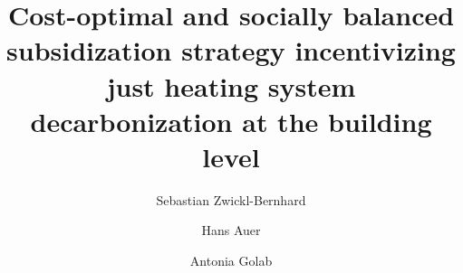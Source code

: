 \documentclass[review]{elsarticle}
\begin{document}
\begin{frontmatter}

\title{Cost-optimal and socially balanced subsidization strategy incentivizing just heating system decarbonization at the building level}
\author[1]{Sebastian Zwickl-Bernhard}
\author[1]{Hans Auer}
\author[1]{Antonia Golab}
\address[1]{Energy Economics Group (EEG), Technische Universität Wien, Gusshausstrasse 25-29/E370-3, 1040 Wien, Austria}

\begin{abstract}

\end{abstract}

\begin{keyword}
	
\end{keyword}
\end{frontmatter}

\newpage
\end{document}
